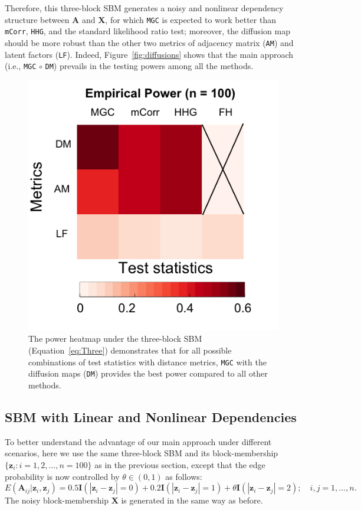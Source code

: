 \documentclass[12pt]{article}
\theoremstyle{definition}
\begin{document}
	Therefore, this three-block SBM generates a noisy and nonlinear dependency structure between $\mathbf{A}$ and $\mathbf{X}$, for which \texttt{MGC} is expected to work better than \texttt{mCorr}, \texttt{HHG}, and the standard likelihood ratio test; moreover, the diffusion map should be more robust than the other two metrics of adjacency matrix (\texttt{AM}) and latent factors (\texttt{LF}). Indeed, Figure~\ref{fig:diffusions} shows that the main approach (i.e., \texttt{MGC} $\circ$ \texttt{DM}) prevails in the testing powers among all the methods.
	
	\begin{figure}
		\centering
		\includegraphics[width=0.4\paperwidth, height=0.4\paperwidth]{../Figure/ThreeSBM_Elbow3.png}
		\caption{The power heatmap under the three-block SBM (Equation~\ref{eq:Three}) demonstrates that for all possible combinations of test statistics with distance metrics, \texttt{MGC} with the diffusion maps (\texttt{DM}) provides the best power compared to all other methods.}
		\label{fig:threeSBM}
	\end{figure}
	
	\subsection{SBM with Linear and Nonlinear Dependencies}
	
	To better understand the advantage of our main approach under different scenarios, here we use the same three-block SBM and its block-membership $\{ \mathbf{z}_{i} : i=1,2, \ldots, n=100 \}$ as in the previous section, except that the edge probability is now controlled by $\theta \in (0, 1)$ as follows:
	\begin{equation}
	E(\mathbf{A}_{ij} | \mathbf{z}_{i}, \mathbf{z}_{j}) = 0.5 \mathbf{I}(|\mathbf{z}_{i} - \mathbf{z}_{j}| = 0) + 0.2 \mathbf{I}(|\mathbf{z}_{i} - \mathbf{z}_{j}| = 1) + \theta \mathbf{I}(|\mathbf{z}_{i} - \mathbf{z}_{j}| = 2); \quad i,j = 1, \ldots, n.
	\label{eq:mono}
	\end{equation}
	The noisy block-membership $\mathbf{X}$ is generated in the same way as before.
	
\end{document}
